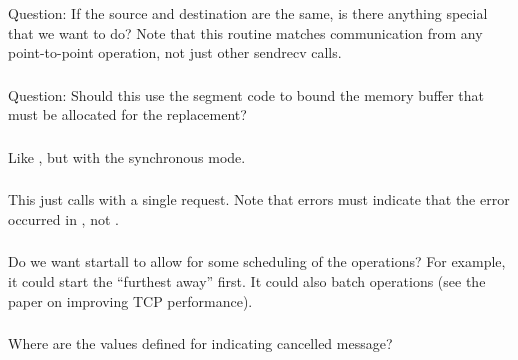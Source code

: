 \documentclass{article}
\begin{document}
\subsubsection{}
Question: If the source and destination are the same, is there anything
special that we want to do?  Note that this routine matches communication from
any point-to-point operation, not just other sendrecv calls.

\subsubsection{}
Question: Should this use the segment code to bound the memory buffer that
must be allocated for the replacement?

\subsubsection{}

\subsubsection{}
Like , but with the synchronous mode.

\subsubsection{}

\subsubsection{}
This just calls  with a single request.  Note that
errors must indicate that the error occurred in , not
.  

\subsubsection{}
Do we want startall to allow for some scheduling of the operations?  For
example, it could start the ``furthest away'' first.  It could also batch
operations (see the paper on improving TCP performance).

\subsubsection{}
Where are the values defined for indicating cancelled message?
\end{document}
